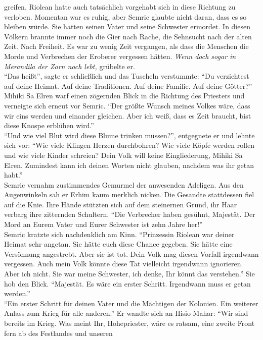 greifen. Riolean hatte auch tatsächlich vorgehabt sich in diese Richtung zu verloben. Momentan war 
es ruhig, aber Semric glaubte nicht daran, dass es so bleiben würde. Sie hatten seinen Vater und 
seine Schwester ermordet. In diesen Völkern brannte immer noch die Gier nach Rache, die Sehnsucht 
nach der alten Zeit. Nach Freiheit. Es war zu wenig Zeit vergangen, als dass die Menschen die Morde 
und Verbrechen der Eroberer vergessen hätten. \textit{Wenn doch sogar in Merandila der Zorn noch 
lebt,} grübelte er.\\
``Das heißt'', sagte er schließlich und das Tuscheln verstummte: ``Du verzichtest auf deine Heimat. 
Auf deine Traditionen. Auf deine Familie. Auf deine Götter?''\\
Mihiki Sa Elren warf einen zögernden Blick in die Richtung des Priesters und verneigte sich erneut 
vor Semric. ``Der größte Wunsch meines Volkes wäre, dass wir eins werden und einander gleichen. 
Aber ich weiß, dass es Zeit braucht, bist diese Knospe erblühen wird.''\\
``Und wie viel Blut wird diese Blume trinken müssen?'', entgegnete er und lehnte sich vor: ``Wie 
viele Klingen Herzen durchbohren? Wie viele Köpfe werden rollen und wie viele Kinder 
schreien? Dein Volk will keine Eingliederung, Mihiki Sa Elren. Zumindest kann ich deinen Worten 
nicht glauben, nachdem was ihr getan habt.''\\
Semric vernahm zustimmendes Gemurmel der anwesenden Adeligen. Aus den Augenwinkeln sah er Erhim 
kaum merklich nicken. Die Gesandte stattdessen fiel auf die Knie. Ihre Hände stützten sich auf dem 
steinernen Grund, ihr Haar verbarg ihre zitternden Schultern. ``Die Verbrecher haben gesühnt, 
Majestät. Der Mord an Eurem Vater und Eurer Schwester ist zehn Jahre her!''\\
Semric kratzte sich nachdenklich am Kinn. ``Prinzessin Riolean war deiner Heimat sehr angetan. 
Sie hätte euch diese Chance gegeben. Sie hätte eine Versöhnung angestrebt. Aber sie ist tot. Dein 
Volk mag diesen Vorfall irgendwann vergessen. Auch mein Volk könnte diese Tat vielleicht irgendwann 
ignorieren. Aber ich nicht. Sie war meine Schwester, ich denke, Ihr könnt das verstehen.''
Sie hob den Blick. ``Majestät. Es wäre ein erster Schritt. Irgendwann muss er getan werden.''\\
``Ein erster Schritt für deinen Vater und die Mächtigen der Kolonien. Ein weiterer Anlass zum Krieg 
für alle anderen.'' Er wandte sich an Hisio-Mahar: ``Wir sind bereits im Krieg. Was meint Ihr, 
Hohepriester, wäre es ratsam, eine zweite Front fern ab des Festlandes und unseren 
